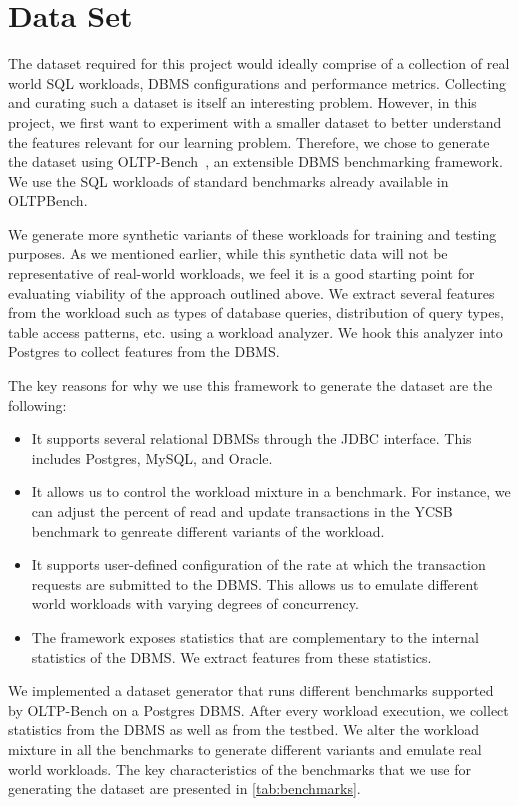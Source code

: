 \section{Data Set} \label{sec:data_set}

The dataset required for this project would ideally comprise of a 
collection of real world SQL workloads, DBMS configurations and performance
metrics. Collecting and curating such a dataset is itself an interesting
problem.
However, in this project, we first want to experiment with a smaller dataset
to better understand the features relevant for our learning problem.
Therefore, we chose to generate the dataset using
OLTP-Bench~\citep{oltpbench14}, an extensible DBMS benchmarking framework.
We use the SQL workloads of standard benchmarks already available
in OLTPBench. 

We generate more synthetic variants of these workloads for training and
testing purposes. As we mentioned earlier, while this synthetic data will not be
representative of real-world workloads, we feel it is a good starting point for
evaluating viability of the approach outlined above.
We extract several features from the workload such as types of database queries,
distribution of query types, table access patterns, etc. using 
a workload analyzer. We hook this analyzer into Postgres to collect 
features from the DBMS.

The key reasons for why we use this framework to generate the dataset 
are the following:

\begin{itemize}
  \item It supports several relational DBMSs through the JDBC interface. This
  includes Postgres, MySQL, and Oracle.
  \item It allows us to control the workload mixture in a benchmark. For
  instance, we can adjust the percent of read and update transactions in 
  the YCSB benchmark to genreate different variants of the workload.
  \item It supports user-defined configuration of the rate at which the
  transaction requests are submitted to the DBMS. This allows us to emulate
  different world workloads with varying degrees of concurrency.
  \item The framework exposes statistics that are complementary to the 
  internal statistics of the DBMS. We extract features from these statistics. 
\end{itemize}

We implemented a dataset generator that runs different benchmarks supported
by OLTP-Bench on a Postgres DBMS. After every workload execution, we
collect statistics from the DBMS as well as from the testbed. We alter the
workload mixture in all the benchmarks to generate different variants and
emulate real world workloads. The key characteristics of the benchmarks
that we use for generating the dataset are presented in \cref{tab:benchmarks}.

